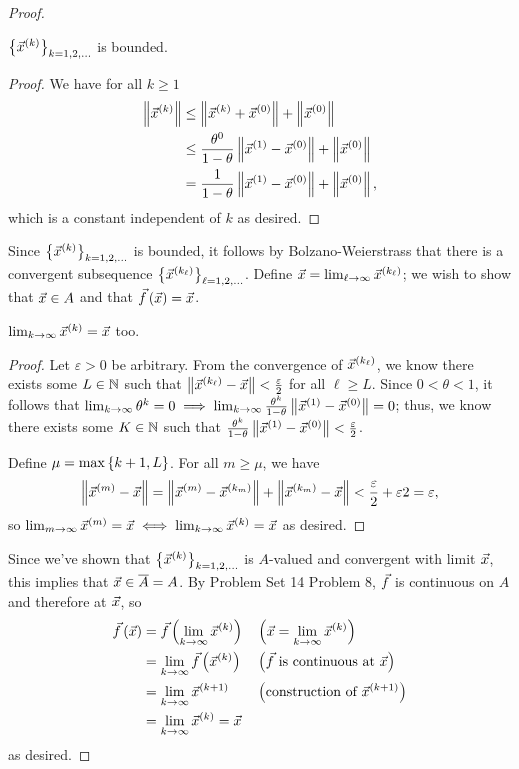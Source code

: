 \documentclass[main.tex]{subfiles}
\begin{document}
\begin{proof}
    \begin{claim}
        $\left\{ \vec{x}^{(k)} \right\}_{k = 1, 2, \ldots}$ is bounded.
    \end{claim}

    \begin{proof}
        We have for all $k \ge 1$
        \begin{align*}
            \left\lVert \vec{x}^{(k)} \right\rVert &\le \left\lVert \vec{x}^{(k)} + \vec{x}^{(0)} \right\rVert + \left\lVert \vec{x}^{(0)} \right\rVert \\
            &\le \frac{\theta^0}{1 - \theta}\left\lVert \vec{x}^{(1)} - \vec{x}^{(0)} \right\rVert + \left\lVert \vec{x}^{(0)} \right\rVert \\
            &= \frac{1}{1 - \theta}\left\lVert \vec{x}^{(1)} - \vec{x}^{(0)} \right\rVert + \left\lVert \vec{x}^{(0)} \right\rVert,
        \end{align*}
        which is a constant independent of $k$ as desired.
    \end{proof}

    Since $\left\{ \vec{x}^{(k)} \right\}_{k = 1, 2, \ldots}$ is bounded, it follows by Bolzano-Weierstrass that there is a convergent subsequence $\left\{ \vec{x}^{(k_\ell)} \right\}_{\ell = 1, 2, \ldots}$. Define $\vec{x} = \lim_{\ell\to\infty} \vec{x}^{(k_\ell)}$; we wish to show that $\vec{x}\in A$ and that $\vec{f}\left( \vec{x} \right) = \vec{x}$.

    \begin{claim}
        $\lim_{k\to \infty} \vec{x}^{(k)} = \vec{x}$ too.
    \end{claim}

    \begin{proof}
        Let $\varepsilon > 0$ be arbitrary. From the convergence of $\vec{x}^{(k_\ell)}$, we know there exists some $L\in \mathbb N$ such that $\left\lVert \vec{x}^{(k_\ell)} - \vec{x} \right\rVert < \frac{\varepsilon}{2}$ for all $\ell \ge L$. Since $0 < \theta < 1$, it follows that $\lim_{k\to \infty} \theta^k = 0\implies \lim_{k\to \infty} \frac{\theta^k}{1 - \theta}\left\lVert \vec{x}^{(1)} - \vec{x}^{(0)} \right\rVert = 0$; thus, we know there exists some $K\in \mathbb N$ such that $\frac{\theta^k}{1 - \theta}\left\lVert \vec{x}^{(1)} - \vec{x}^{(0)} \right\rVert < \frac{\varepsilon}{2}$.

        Define $\mu = \max\left\{ k + 1, L \right\}$. For all $m \ge \mu$, we have
        \[\left\lVert \vec{x}^{(m)} - \vec{x} \right\rVert = \left\lVert \vec{x}^{(m)} - \vec{x}^{(k_m)} \right\rVert + \left\lVert \vec{x}^{(k_m)} - \vec{x} \right\rVert < \frac{\varepsilon}{2} + \varepsilon{2} = \varepsilon,\]
        so $\lim_{m\to\infty} \vec{x}^{(m)} = \vec{x}\iff \lim_{k\to \infty} \vec{x}^{(k)} = \vec{x}$ as desired.
    \end{proof}

    Since we've shown that $\left\{ \vec{x}^{(k)} \right\}_{k = 1, 2, \ldots}$ is $A$-valued and convergent with limit $\vec{x}$, this implies that $\vec{x}\in \overline{A} = A$. By Problem Set 14 Problem 8, $\vec{f}$ is continuous on $A$ and therefore at $\vec{x}$, so
    \begin{align*}
        \vec{f}\left( \vec{x} \right) &= \vec{f}\left( \lim_{k\to \infty} \vec{x}^{(k)} \right) && \left( \vec{x} = \lim_{k\to \infty} \vec{x}^{(k)} \right) \\
        &= \lim_{k\to \infty} \vec{f}\left( \vec{x}^{(k)} \right) && \left( \vec{f}\text{ is continuous at }\vec{x} \right) \\
        &= \lim_{k\to \infty} \vec{x}^{(k + 1)} && \left( \text{construction of }\vec{x}^{(k + 1)} \right) \\
        &= \lim_{k\to \infty} \vec{x}^{(k)} = \vec{x}
    \end{align*}
    as desired.
\end{proof}
\end{document}
